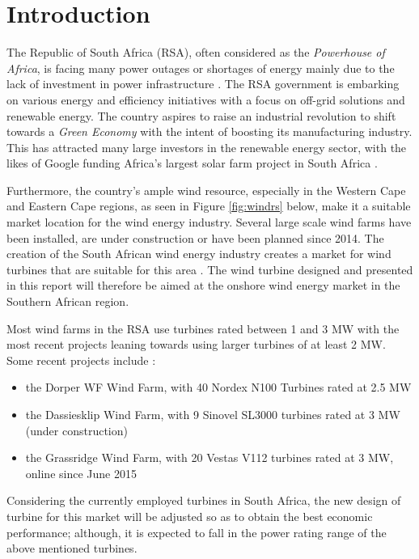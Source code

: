 \section{Introduction}

The Republic of South Africa (RSA), often considered as the \textit{Powerhouse of Africa}, is facing many power outages or shortages of energy mainly due to the lack of investment in power infrastructure \cite{southafrica}. The RSA government is embarking on various energy and efficiency initiatives with a focus on off-grid solutions and renewable energy. The country aspires to raise an industrial revolution to shift towards a \textit{Green Economy} with the intent of boosting its manufacturing industry. This has attracted many large investors in the renewable energy sector, with the likes of Google funding Africa’s largest solar farm project in South Africa \cite{southafricarenew}.

Furthermore, the country’s ample wind resource, especially in the Western Cape and Eastern Cape regions, as seen in Figure \ref{fig:windrs} below, make it a suitable market location for the wind energy industry. Several large scale wind farms have been installed, are under construction or have been planned since 2014. The creation of the South African wind energy industry creates a market for wind turbines that are suitable for this area \cite{southafricawind}. The wind turbine designed and presented in this report will therefore be aimed at the onshore wind energy market in the Southern African region.

Most wind farms in the RSA use turbines rated between 1 and 3 MW with the most recent projects leaning towards using larger turbines of at least 2 MW. Some recent projects include \cite{southafrica}:
\begin{itemize}
    \item the Dorper WF Wind Farm, with 40 Nordex N100 Turbines rated at 2.5 MW
    \item the Dassiesklip Wind Farm, with 9 Sinovel SL3000 turbines rated at 3 MW (under construction)
    \item the Grassridge Wind Farm, with 20 Vestas V112 turbines rated at 3 MW, online since June 2015
\end{itemize}

 Considering the currently employed turbines in South Africa, the new design of turbine for this market will be adjusted so as to obtain the best economic performance; although, it is expected to fall in the power rating range of the above mentioned turbines.

